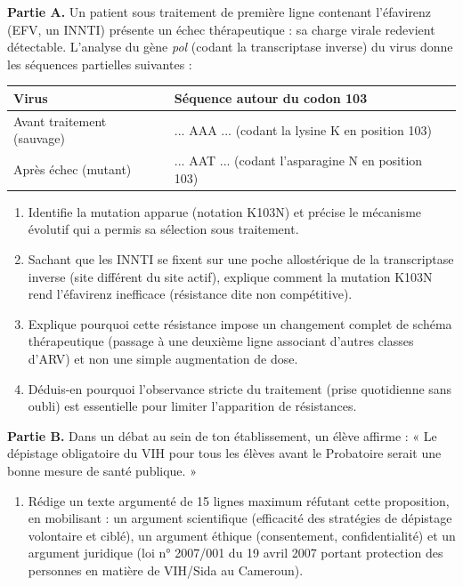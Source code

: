\documentclass[11pt]{article}
\begin{document}
\begin{exercice}
\textbf{Partie A.} Un patient sous traitement de première ligne contenant l'éfavirenz (EFV, un INNTI) présente un échec thérapeutique : sa charge virale redevient détectable. L'analyse du gène \emph{pol} (codant la transcriptase inverse) du virus donne les séquences partielles suivantes :

\begin{center}
\begin{tabularx}{\linewidth}{|l|X|}\hline
\rowcolor{popblueL} Virus & Séquence autour du codon 103 \\ \hline
Avant traitement (sauvage) & ... AAA ... (codant la lysine K en position 103) \\ \hline
Après échec (mutant) & ... AAT ... (codant l'asparagine N en position 103) \\ \hline
\end{tabularx}
\end{center}

\begin{enumerate}
\item Identifie la mutation apparue (notation K103N) et précise le mécanisme évolutif qui a permis sa sélection sous traitement.
\item Sachant que les INNTI se fixent sur une poche allostérique de la transcriptase inverse (site différent du site actif), explique comment la mutation K103N rend l'éfavirenz inefficace (résistance dite non compétitive).
\item Explique pourquoi cette résistance impose un changement complet de schéma thérapeutique (passage à une deuxième ligne associant d'autres classes d'ARV) et non une simple augmentation de dose.
\item Déduis-en pourquoi l'observance stricte du traitement (prise quotidienne sans oubli) est essentielle pour limiter l'apparition de résistances.
\end{enumerate}

\textbf{Partie B.} Dans un débat au sein de ton établissement, un élève affirme : « Le dépistage obligatoire du VIH pour tous les élèves avant le Probatoire serait une bonne mesure de santé publique. »

\begin{enumerate}
\item[5.] Rédige un texte argumenté de 15 lignes maximum réfutant cette proposition, en mobilisant : un argument scientifique (efficacité des stratégies de dépistage volontaire et ciblé), un argument éthique (consentement, confidentialité) et un argument juridique (loi n° 2007/001 du 19 avril 2007 portant protection des personnes en matière de VIH/Sida au Cameroun).
\end{enumerate}
\end{exercice}
\end{document}
